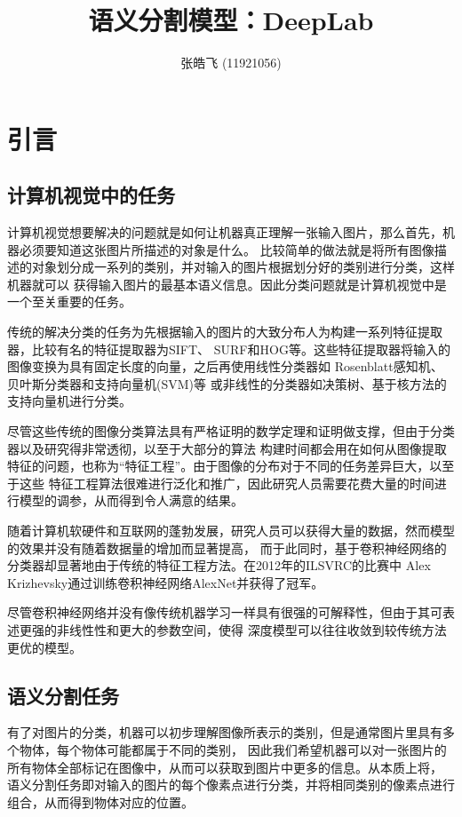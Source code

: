 \documentclass[10pt, a4paper]{article}
\begin{document}
\begin{titlepage}
\author{张皓飞 (11921056)}
\title{语义分割模型：DeepLab}
\maketitle
\thispagestyle{empty}
\end{titlepage}

\newpage
\tableofcontents
\newpage
{}

\section{引言}
\subsection{计算机视觉中的任务}
计算机视觉想要解决的问题就是如何让机器真正理解一张输入图片，那么首先，机器必须要知道这张图片所描述的对象是什么。
比较简单的做法就是将所有图像描述的对象划分成一系列的类别，并对输入的图片根据划分好的类别进行分类，这样机器就可以
获得输入图片的最基本语义信息。因此分类问题就是计算机视觉中是一个至关重要的任务。

传统的解决分类的任务为先根据输入的图片的大致分布人为构建一系列特征提取器，比较有名的特征提取器为SIFT\cite{SIFT}、
SURF\cite{SURF}和HOG\cite{HOG}等。这些特征提取器将输入的图像变换为具有固定长度的向量，之后再使用线性分类器如
Rosenblatt感知机\cite{Rosenblatt}、贝叶斯分类器\cite{SimonNNLM}和支持向量机(SVM)\cite{SVM-Kernel}等
或非线性的分类器如决策树\cite{DataMining}、基于核方法的支持向量机\cite{SVM-Kernel}进行分类。

尽管这些传统的图像分类算法具有严格证明的数学定理和证明做支撑，但由于分类器以及研究得非常透彻，以至于大部分的算法
构建时间都会用在如何从图像提取特征的问题，也称为“特征工程”。由于图像的分布对于不同的任务差异巨大，以至于这些
特征工程算法很难进行泛化和推广，因此研究人员需要花费大量的时间进行模型的调参，从而得到令人满意的结果。

随着计算机软硬件和互联网的蓬勃发展，研究人员可以获得大量的数据，然而模型的效果并没有随着数据量的增加而显著提高，
而于此同时，基于卷积神经网络的分类器却显著地由于传统的特征工程方法。在2012年的ILSVRC\cite{ILSVRC}的比赛中
Alex Krizhevsky通过训练卷积神经网络AlexNet\cite{AlexNet}并获得了冠军。

尽管卷积神经网络并没有像传统机器学习一样具有很强的可解释性，但由于其可表述更强的非线性性和更大的参数空间，使得
深度模型可以往往收敛到较传统方法更优的模型。

\subsection{语义分割任务}
有了对图片的分类，机器可以初步理解图像所表示的类别，但是通常图片里具有多个物体，每个物体可能都属于不同的类别，
因此我们希望机器可以对一张图片的所有物体全部标记在图像中，从而可以获取到图片中更多的信息。从本质上将，
语义分割任务即对输入的图片的每个像素点进行分类，并将相同类别的像素点进行组合，从而得到物体对应的位置。
\end{document}
